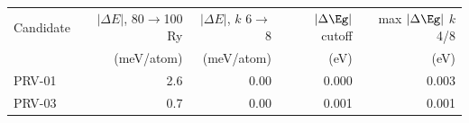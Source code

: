 \begin{tabular}{@{}lrrrr@{}}\toprule
 Candidate & $|\Delta E|$, 80$\to$100 Ry & $|\Delta E|$, $k$ 6$\to$8 & $|\Delta\Eg|$ cutoff & max $|\Delta\Eg|$ $k$ 4/8\\
 & (meV/atom) & (meV/atom) & (eV) & (eV)\\\midrule
PRV-01 & 2.6 & 0.00 & 0.000 & 0.003 \\
PRV-03 & 0.7 & 0.00 & 0.001 & 0.001 \\
\bottomrule\end{tabular}
